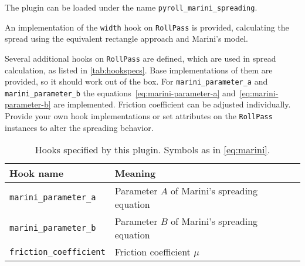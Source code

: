 \documentclass[11pt]{PyRollDocs}
\begin{document}
    The plugin can be loaded under the name \texttt{pyroll\_marini\_spreading}.

    An implementation of the \lstinline{width} hook on \lstinline{RollPass} is provided,
    calculating the spread using the equivalent rectangle approach and Marini's model.

    Several additional hooks on \lstinline{RollPass} are defined, which are used in spread calculation, as listed in \autoref{tab:hookspecs}.
    Base implementations of them are provided, so it should work out of the box.
    For \lstinline{marini_parameter_a} and \lstinline{marini_parameter_b} the equations~\ref{eq:marini-parameter-a} and~\ref{eq:marini-parameter-b} are implemented.
    Friction coefficient can be adjusted individually.
    Provide your own hook implementations or set attributes on the \lstinline{RollPass} instances to alter the spreading behavior.

    \begin{table}
        \centering
        \caption{Hooks specified by this plugin. Symbols as in \autoref{eq:marini}.}
        \label{tab:hookspecs}
        \begin{tabular}{ll}
            \toprule
            Hook name                     & Meaning                                      \\
            \midrule
            \texttt{marini\_parameter\_a}   & Parameter $A$ of Marini's spreading equation \\
            \texttt{marini\_parameter\_b}   & Parameter $B$ of Marini's spreading equation \\
            \texttt{friction\_coefficient} & Friction coefficient $\mu$                   \\
            \bottomrule
        \end{tabular}
    \end{table}

    \printbibliography
\end{document}
